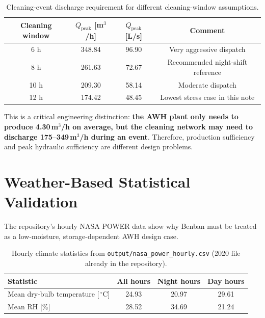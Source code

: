 \documentclass[11pt,a4paper]{article}
\begin{document}
\begin{table}[h]
\centering
\caption{Cleaning-event discharge requirement for different cleaning-window assumptions.}
\begin{tabular}{@{}cccc@{}}
\toprule
\textbf{Cleaning window} & \textbf{$Q_{\mathrm{peak}}$ [m$^3$/h]} & \textbf{$Q_{\mathrm{peak}}$ [L/s]} & \textbf{Comment} \\
\midrule
6 h  & 348.84 & 96.90 & Very aggressive dispatch \\
8 h  & 261.63 & 72.67 & Recommended night-shift reference \\
10 h & 209.30 & 58.14 & Moderate dispatch \\
12 h & 174.42 & 48.45 & Lowest stress case in this note \\
\bottomrule
\end{tabular}
\end{table}

\noindent
This is a critical engineering distinction: \textbf{the AWH plant only needs to produce 4.30\,m$^3$/h on average, but the cleaning network may need to discharge 175--349\,m$^3$/h during an event}. Therefore, production sufficiency and peak hydraulic sufficiency are different design problems.

\section{Weather-Based Statistical Validation}
The repository's hourly NASA POWER data show why Benban must be treated as a low-moisture, storage-dependent AWH design case.

\begin{table}[h]
\centering
\caption{Hourly climate statistics from \texttt{output/nasa\_power\_hourly.csv} (2020 file already in the repository).}
\begin{tabular}{@{}lccc@{}}
\toprule
\textbf{Statistic} & \textbf{All hours} & \textbf{Night hours} & \textbf{Day hours} \\
\midrule
Mean dry-bulb temperature [\,$^\circ$C] & 24.93 & 20.97 & 29.61 \\
Mean RH [\%] & 28.52 & 34.69 & 21.24 \\
\bottomrule
\end{tabular}
\end{table}
\end{document}
